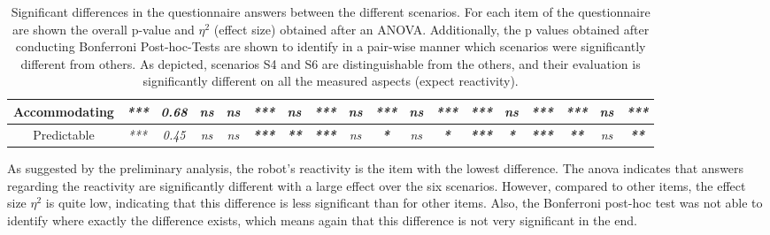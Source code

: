 \begin{sidewaystable}
\begin{tabular}{c|cc|ccccccccccccccc|}
        \multicolumn{1}{|c|}{\textbf{Accommodating}} & \multicolumn{1}{c|}{\textit{***}} & \textit{\textbf{0.68}} & \multicolumn{1}{c|}{\textit{ns}} & \multicolumn{1}{c|}{\textit{ns}} & \multicolumn{1}{c|}{\textit{\textbf{***}}} & \multicolumn{1}{c|}{\textit{ns}}          & \multicolumn{1}{c|}{\textit{\textbf{***}}} & \multicolumn{1}{c|}{\textit{ns}} & \multicolumn{1}{c|}{\textit{\textbf{***}}} & \multicolumn{1}{c|}{\textit{ns}} & \multicolumn{1}{c|}{\textit{\textbf{***}}} & \multicolumn{1}{c|}{\textit{\textbf{***}}} & \multicolumn{1}{c|}{\textit{ns}}         & \multicolumn{1}{c|}{\textit{\textbf{***}}} & \multicolumn{1}{c|}{\textit{\textbf{***}}} & \multicolumn{1}{c|}{\textit{ns}} & \textit{\textbf{***}} \\ \hline
        \multicolumn{1}{|c|}{Predictable}            & \multicolumn{1}{c|}{\textit{***}} & \textit{0.45}          & \multicolumn{1}{c|}{\textit{ns}} & \multicolumn{1}{c|}{\textit{ns}} & \multicolumn{1}{c|}{\textit{\textbf{***}}} & \multicolumn{1}{c|}{\textit{\textbf{**}}} & \multicolumn{1}{c|}{\textit{\textbf{***}}} & \multicolumn{1}{c|}{\textit{ns}} & \multicolumn{1}{c|}{\textit{\textbf{*}}}   & \multicolumn{1}{c|}{\textit{ns}} & \multicolumn{1}{c|}{\textit{\textbf{*}}}   & \multicolumn{1}{c|}{\textit{\textbf{***}}} & \multicolumn{1}{c|}{\textit{\textbf{*}}} & \multicolumn{1}{c|}{\textit{\textbf{***}}} & \multicolumn{1}{c|}{\textit{\textbf{**}}}  & \multicolumn{1}{c|}{\textit{ns}} & \textit{\textbf{**}}  \\ \hline
        \end{tabular}
        \caption{Significant differences in the questionnaire answers between the different scenarios. For each item of the questionnaire are shown the overall p-value and $\eta^2$ (effect size) obtained after an ANOVA. Additionally, the p values obtained after conducting Bonferroni Post-hoc-Tests are shown to identify in a pair-wise manner which scenarios were significantly different from others. As depicted, scenarios S4 and S6 are distinguishable from the others, and their evaluation is significantly different on all the measured aspects (expect reactivity).}
        \label{tab:questionnaire_answers}
\end{sidewaystable}

As suggested by the preliminary analysis, the robot's reactivity is the item with the lowest difference. The \acrshort{anova} indicates that answers regarding the reactivity are significantly different with a large effect over the six scenarios. However, compared to other items, the effect size $\eta^2$ is quite low, indicating that this difference is less significant than for other items. Also, the Bonferroni post-hoc test was not able to identify where exactly the difference exists, which means again that this difference is not very significant in the end. 

